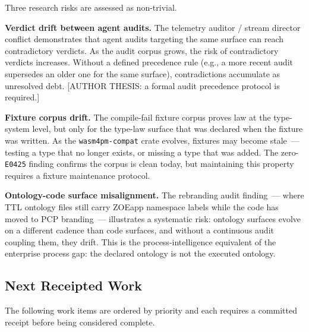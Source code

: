 Three research risks are assessed as non-trivial.

\textbf{Verdict drift between agent audits.} The telemetry auditor / stream
director conflict demonstrates that agent audits targeting the same surface can
reach contradictory verdicts. As the audit corpus grows, the risk of contradictory
verdicts increases. Without a defined precedence rule (e.g., a more recent audit
supersedes an older one for the same surface), contradictions accumulate as
unresolved debt. [AUTHOR THESIS: a formal audit precedence protocol is required.]

\textbf{Fixture corpus drift.} The compile-fail fixture corpus proves law at the
type-system level, but only for the type-law surface that was declared when the
fixture was written. As the \texttt{wasm4pm-compat} crate evolves, fixtures may
become stale~--- testing a type that no longer exists, or missing a type that was
added. The zero-\texttt{E0425} finding confirms the corpus is clean today, but
maintaining this property requires a fixture maintenance protocol.

\textbf{Ontology-code surface misalignment.} The rebranding audit finding~---
where TTL ontology files still carry ZOEapp namespace labels while the code has
moved to PCP branding~--- illustrates a systematic risk: ontology surfaces evolve
on a different cadence than code surfaces, and without a continuous audit
coupling them, they drift. This is the process-intelligence equivalent of the
enterprise process gap: the declared ontology is not the executed ontology.

\subsection{Next Receipted Work}
\label{sec:audits-open-next}

The following work items are ordered by priority and each requires a committed
receipt before being considered complete.

